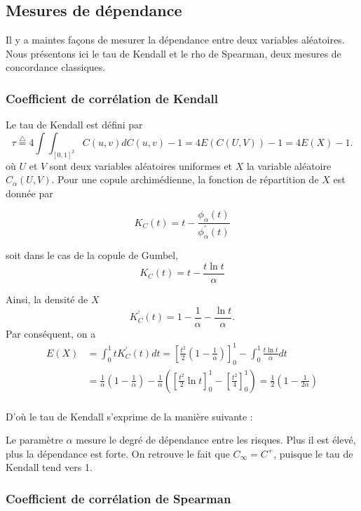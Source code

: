 \documentclass[11pt]{article}
\begin{document}
\subsection{Mesures de d\'ependance}
Il y a maintes fa\c{c}ons de mesurer la d\'ependance entre deux variables al\'eatoires. Nous pr\'esentons ici le tau de Kendall
et le rho de Spearman, deux mesures de concordance classiques. 

\subsubsection{Coefficient de corr\'elation de Kendall}
Le tau de Kendall est d\'efini par
$$\tau \stackrel{\triangle}{=} 4\int\!\!\!\!\int_{[0,1]^2}C(u,v)dC(u,v)-1 = 4 E\left(C\left(U,V\right)\right)-1=4 E(X)-1.$$
o\`u $U$ et $V$ sont deux variables al\'eatoires uniformes et $X$ la variable al\'eatoire $C_\alpha(U,V)$.
Pour une copule archim\'edienne, la fonction de r\'epartition de $X$ est donn\'ee par

$$K_C(t)=t-\frac{\phi_\alpha(t)}{\phi_\alpha^\prime(t)}$$

soit dans le cas de la copule de Gumbel, 
$$K_C(t)=t-\frac{t\ln t}{\alpha}$$

Ainsi, la densit\'e de $X$ 
$$K_C^\prime(t)=1-\frac{1}{\alpha}-\frac{\ln t}{\alpha}.$$
Par cons\'equent, on a 
\begin{align*}
 E(X) &= \int^1_0tK_C^\prime(t)dt= \left[\frac{t^2}{2}\left(1-\frac{1}{\alpha}\right)\right]^1_0-\int^1_0\frac{t\ln t}{\alpha}dt \\
      &= \frac{1}{\alpha}\left(1-\frac{1}{\alpha}\right) - \frac{1}{\alpha}\left(\left[\frac{t^2}{2}\ln t\right]^1_0-\left[\frac{t^2}{4}\right]^1_0\right)
      =\frac{1}{2}\left(1-\frac{1}{2\alpha}\right)\\
\end{align*}

D'o\`u le tau de Kendall s'exprime de la mani\`ere suivante :
\begin{center}
\end{center}

\medskip

Le param\`etre $\alpha$ mesure le degr\'e de d\'ependance entre les risques. Plus il est \'elev\'e, plus la d\'ependance est forte. 
On retrouve le fait que $C_{\infty}=C^+$, puisque le tau de Kendall tend vers 1.



\subsubsection{Coefficient de corr\'elation de Spearman}
\end{document}
